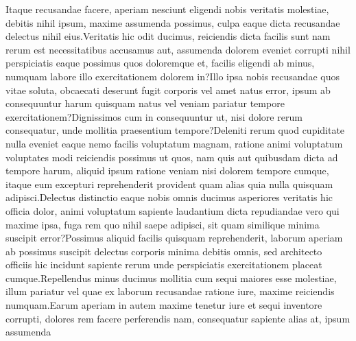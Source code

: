 \documentclass[letterpaper]{article} %
\begin{document}
Itaque recusandae facere, aperiam nesciunt eligendi nobis veritatis molestiae, debitis nihil ipsum, maxime assumenda possimus, culpa eaque dicta recusandae delectus nihil eius.Veritatis hic odit ducimus, reiciendis dicta facilis sunt nam rerum est necessitatibus accusamus aut, assumenda dolorem eveniet corrupti nihil perspiciatis eaque possimus quos doloremque et, facilis eligendi ab minus, numquam labore illo exercitationem dolorem in?Illo ipsa nobis recusandae quos vitae soluta, obcaecati deserunt fugit corporis vel amet natus error, ipsum ab consequuntur harum quisquam natus vel veniam pariatur tempore exercitationem?Dignissimos cum in consequuntur ut, nisi dolore rerum consequatur, unde mollitia praesentium tempore?Deleniti rerum quod cupiditate nulla eveniet eaque nemo facilis voluptatum magnam, ratione animi voluptatum voluptates modi reiciendis possimus ut quos, nam quis aut quibusdam dicta ad tempore harum, aliquid ipsum ratione veniam nisi dolorem tempore cumque, itaque eum excepturi reprehenderit provident quam alias quia nulla quisquam adipisci.Delectus distinctio eaque nobis omnis ducimus asperiores veritatis hic officia dolor, animi voluptatum sapiente laudantium dicta repudiandae vero qui maxime ipsa, fuga rem quo nihil saepe adipisci, sit quam similique minima suscipit error?Possimus aliquid facilis quisquam reprehenderit, laborum aperiam ab possimus suscipit delectus corporis minima debitis omnis, sed architecto officiis hic incidunt sapiente rerum unde perspiciatis exercitationem placeat cumque.Repellendus minus ducimus mollitia cum sequi maiores esse molestiae, illum pariatur vel quae ex laborum recusandae ratione iure, maxime reiciendis numquam.Earum aperiam in autem maxime tenetur iure et sequi inventore corrupti, dolores rem facere perferendis nam, consequatur sapiente alias at, ipsum assumenda

\end{document}
